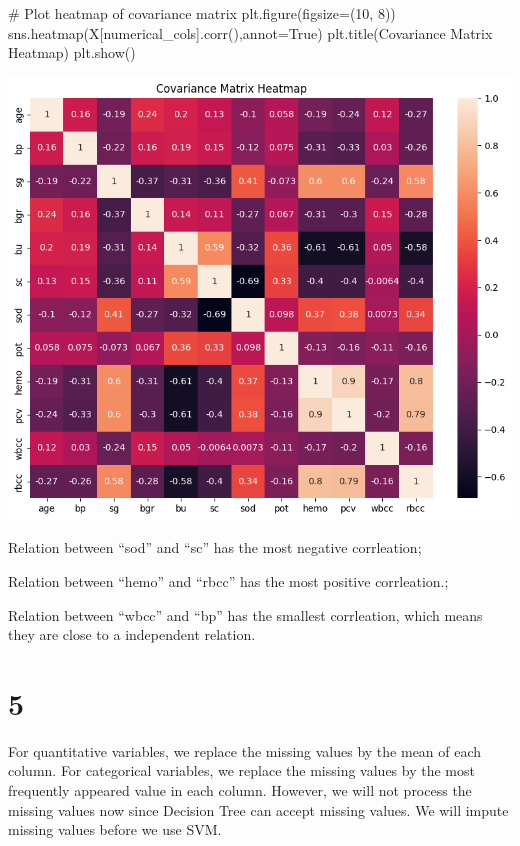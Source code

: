 \documentclass[
  11pt,
  letterpaper,
  DIV=11,
  numbers=noendperiod]{scrartcl}
\newenvironment{Shaded}{\begin{snugshade}}{\end{snugshade}}
\newcommand{\CommentTok}[1]{\textcolor[rgb]{0.37,0.37,0.37}{#1}}
\newcommand{\DecValTok}[1]{\textcolor[rgb]{0.68,0.00,0.00}{#1}}
\newcommand{\NormalTok}[1]{\textcolor[rgb]{0.00,0.23,0.31}{#1}}
\newcommand{\OperatorTok}[1]{\textcolor[rgb]{0.37,0.37,0.37}{#1}}
\newcommand{\StringTok}[1]{\textcolor[rgb]{0.13,0.47,0.30}{#1}}
\newcommand{\VariableTok}[1]{\textcolor[rgb]{0.07,0.07,0.07}{#1}}
\begin{document}
\begin{Shaded}
\begin{Highlighting}[]
\CommentTok{\# Plot heatmap of covariance matrix}
\NormalTok{plt.figure(figsize}\OperatorTok{=}\NormalTok{(}\DecValTok{10}\NormalTok{, }\DecValTok{8}\NormalTok{))}
\NormalTok{sns.heatmap(X[numerical\_cols].corr(),annot}\OperatorTok{=}\VariableTok{True}\NormalTok{)}
\NormalTok{plt.title(}\StringTok{\textquotesingle{}Covariance Matrix Heatmap\textquotesingle{}}\NormalTok{)}
\NormalTok{plt.show()}
\end{Highlighting}
\end{Shaded}

\includegraphics{Assignment6_Final version_files/figure-pdf/cell-17-output-1.png}

Relation between ``sod'' and ``sc'' has the most negative corrleation;

Relation between ``hemo'' and ``rbcc'' has the most positive
corrleation.;

Relation between ``wbcc'' and ``bp'' has the smallest corrleation, which
means they are close to a independent relation.

\section{5}\label{section-3}

For quantitative variables, we replace the missing values by the mean of
each column. For categorical variables, we replace the missing values by
the most frequently appeared value in each column. However, we will not
process the missing values now since Decision Tree can accept missing
values. We will impute missing values before we use SVM.
\end{document}
